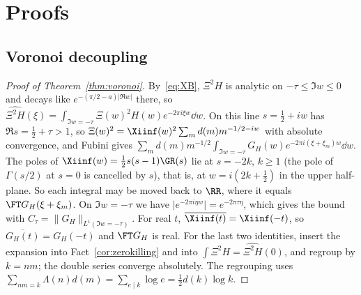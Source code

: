\section{Proofs}\label{app:proofs}

\subsection{Voronoi decoupling}\label{app:proofs-voronoi}
\begin{proof}[Proof of Theorem~\textup{\ref{thm:voronoi}}]
By~\eqref{eq:XB}, $\Xi^2H$ is analytic on $-\tau\le\Im w\le0$ and decays like
$e^{-(\pi/2-a)\lvert\Re w\rvert}$ there, so
$\widehat{\Xi^2H}(\xi)=\int_{\Im w=-\tau}\Xi(w)^2H(w)e^{-2\pi i\xi w}\dd w$. On this line
$s=\frac12+iw$ has $\Re s=\frac12+\tau>1$, so $\Xi(w)^2=\Xiinf(w)^2\sum_md(m)m^{-1/2-iw}$ with absolute
convergence, and Fubini gives
$\sum_md(m)m^{-1/2}\int_{\Im w=-\tau}G_H(w)e^{-2\pi i(\xi+\xi_m)w}\dd w$. The poles of
$\Xiinf(w)=\frac12s(s-1)\GR(s)$ lie at $s=-2k$, $k\ge1$ (the pole of $\Gamma(s/2)$ at $s=0$ is
cancelled by $s$), that is, at $w=i(2k+\frac12)$ in the upper half-plane. So each integral may be moved
back to $\RR$, where it equals $\FT G_H(\xi+\xi_m)$. On $\Im w=-\tau$ we have
$\lvert e^{-2\pi i\eta w}\rvert=e^{-2\pi\tau\eta}$, which gives the bound with
$C_\tau=\lVert G_H\rVert_{L^1(\Im w=-\tau)}$. For real $t$, $\overline{\Xiinf(t)}=\Xiinf(-t)$, so
$\overline{G_H(t)}=G_H(-t)$ and $\FT G_H$ is real.
For the last two identities, insert the expansion into Fact~\ref{cor:zerokilling} and into
$\int\Xi^2H=\widehat{\Xi^2H}(0)$, and regroup by $k=nm$; the double series converge absolutely. The
regrouping uses $\sum_{nm=k}\Lambda(n)d(m)=\sum_{e\mid k}\log e=\frac12d(k)\log k$.
\end{proof}

